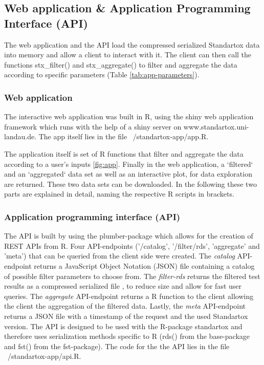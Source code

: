 \subsection*{Web application \& Application Programming Interface (API)}

The web application and the API load the compressed serialized Standartox data into memory and allow a client to interact with it. The client can then call the functions stx\_filter() and stx\_aggregate() to filter and aggregate the data according to specific parameters (Table \ref{tab:app-parameters}).

\subsubsection*{Web application}
The interactive web application was built in R, using the shiny web application framework \citep{chang_shiny_2018} which runs with the help of a shiny server \citep{HOW-TO-CITE-SHINY-SERVER} on www.standartox.uni-landau.de. The app itself lies in the file ~/standartox-app/app.R.


The application itself is set of R functions that filter and aggregate the data according to a user's inputs \ref{fig:app}. Finally in the web application, a `filtered` and an `aggregated` data set as well as an interactive plot, for data exploration are returned. These two data sets can be downloaded. In the following these two parts are explained in detail, naming the respective R scripts in brackets.

\subsubsection*{Application programming interface (API)}
The API is built by using the plumber-package \citep{trestletechnologyllc_plumber_2018} which allows for the creation of REST APIs from R. Four API-endpoints ('/catalog', '/filter/rds', 'aggregate' and 'meta') that can be queried from the client side were created. The \textit{catalog} API-endpoint returns a JavaScript Object Notation (JSON) file containing a catalog of possible filter parameters to choose from. The \textit{filter-rds} returns the filtered test results as a compressed serialized file \citep{klik_fst_2019}, to reduce size and allow for fast user queries. The \textit{aggregate} API-endpoint returns a R function to the client allowing the client the aggregation of the filtered data. Lastly, the \textit{meta} API-endpoint returns a JSON file with a timestamp of the request and the used Standartox version. The API is designed to be used with the R-package standartox and therefore uses serialization methods specific to R (rds() from the base-package and fst() from the fst-package). The code for the the API lies in the file ~/standartox-app/api.R.

